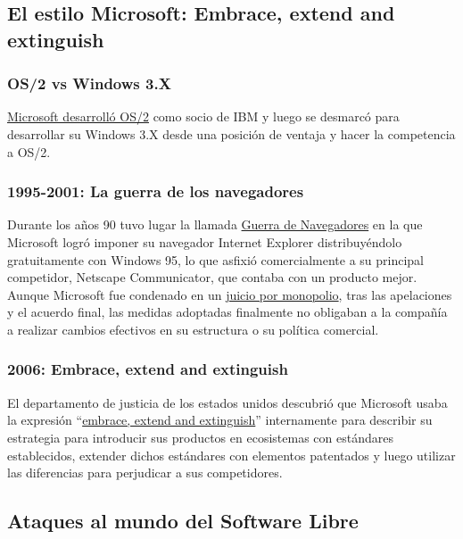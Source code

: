 \documentclass[10pt, titlepage]{article}
\begin{document}
\subsection{El estilo Microsoft: Embrace, extend and extinguish}

\subsubsection{OS/2 vs Windows 3.X}
\href{https://www.quora.com/Why-did-IBMs-OS-2-project-lose-to-Microsoft-given-that-IBM-had-much-more-resources-than-Microsoft-at-that-time}{Microsoft desarrolló OS/2} como socio de IBM y luego se desmarcó para desarrollar su Windows 3.X desde una posición de ventaja y hacer la competencia a OS/2.

\subsubsection{1995-2001: La guerra de los navegadores}
Durante los años 90 tuvo lugar la llamada \href{https://es.wikipedia.org/wiki/Guerra_de_navegadores}{Guerra de Navegadores} en la que Microsoft logró imponer su navegador Internet Explorer distribuyéndolo gratuitamente con Windows 95, lo que asfixió comercialmente a su principal competidor, Netscape Communicator, que contaba con un producto mejor. Aunque Microsoft fue condenado en un \href{https://es.wikipedia.org/wiki/Caso_Estados_Unidos_contra_Microsoft}{juicio por monopolio}, tras las apelaciones y el acuerdo final, las medidas adoptadas finalmente no obligaban a la compañía a realizar cambios efectivos en su estructura o su política comercial.

\subsubsection{2006: Embrace, extend and extinguish}
El departamento de justicia de los estados unidos descubrió que Microsoft usaba la expresión ``\href{https://en.wikipedia.org/wiki/Embrace,_extend,_and_extinguish}{embrace, extend and extinguish}'' internamente para describir su estrategia para introducir sus productos en ecosistemas con estándares establecidos, extender dichos estándares con elementos patentados y luego utilizar las diferencias para perjudicar a sus competidores.

\subsection{Ataques al mundo del Software Libre}
\end{document}
